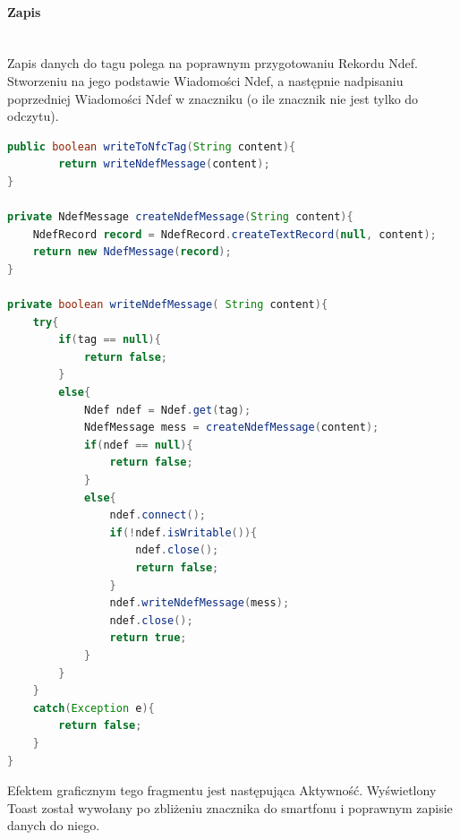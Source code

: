 \documentclass{article}
\numberwithin{equation}{section}
\begin{document}
\paragraph{Zapis}\mbox{}\\
Zapis danych do tagu polega na poprawnym przygotowaniu Rekordu Ndef. Stworzeniu na jego podstawie Wiadomości Ndef, a następnie nadpisaniu poprzedniej Wiadomości Ndef w znaczniku (o ile znacznik nie jest tylko do odczytu).
\begin{lstlisting}[language=Java]
public boolean writeToNfcTag(String content){
        return writeNdefMessage(content);
}

private NdefMessage createNdefMessage(String content){
    NdefRecord record = NdefRecord.createTextRecord(null, content);
    return new NdefMessage(record);
}

private boolean writeNdefMessage( String content){
    try{
        if(tag == null){
            return false;
        }
        else{
            Ndef ndef = Ndef.get(tag);
            NdefMessage mess = createNdefMessage(content);
            if(ndef == null){
                return false;
            }
            else{
                ndef.connect();
                if(!ndef.isWritable()){
                    ndef.close();
                    return false;
                }
                ndef.writeNdefMessage(mess);
                ndef.close();
                return true;
            }
        }
    }
    catch(Exception e){
        return false;
    }
}
\end{lstlisting}
Efektem graficznym tego fragmentu jest następująca Aktywność. Wyświetlony Toast został wywołany po zbliżeniu znacznika do smartfonu i poprawnym zapisie danych do niego.
\end{document}
